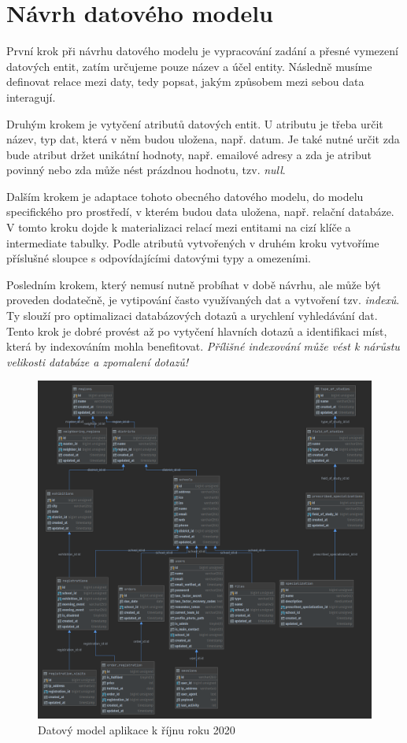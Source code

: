 \section{Návrh datového modelu}
\label{sub:data-model}

První krok\cite{data-model} při návrhu datového modelu je vypracování zadání a přesné vymezení datových entit, zatím určujeme pouze název a účel entity. Následně musíme definovat relace mezi daty, tedy popsat, jakým způsobem mezi sebou data interagují.

Druhým krokem je vytyčení atributů datových entit. U atributu je třeba určit název, typ dat, která v něm budou uložena, např. datum. Je také nutné určit zda bude atribut držet unikátní hodnoty, např. emailové adresy a zda je atribut povinný nebo zda může nést prázdnou hodnotu, tzv. \emph{null}\cite{null}.

Dalším krokem je adaptace tohoto obecného datového modelu, do modelu specifického pro prostředí, v kterém budou data uložena, např. relační databáze. V tomto kroku dojde k materializaci relací mezi entitami na cizí klíče a intermediate tabulky\cite{intermediate-table}. Podle atributů vytvořených v druhém kroku vytvoříme příslušné sloupce s odpovídajícími datovými typy a omezeními. 

Posledním krokem, který nemusí nutně probíhat v době návrhu, ale může být proveden dodatečně, je vytipování často využívaných dat a vytvoření tzv. \emph{indexů}\cite{index}. Ty slouží pro optimalizaci databázových dotazů a urychlení vyhledávání dat. Tento krok je dobré provést až po vytyčení hlavních dotazů a identifikaci míst, která by indexováním mohla benefitovat. \emph{Přílišné indexování může vést k nárůstu velikosti databáze a zpomalení dotazů!}\cite{bad-indexing}

\begin{figure}[h]
\centering
\includegraphics[width=\textwidth]{img/datovy-model-rijen-2020-2.png}
\caption{Datový model aplikace \bso  k říjnu roku 2020}
\label{fig:data-model-2020}
\end{figure}

